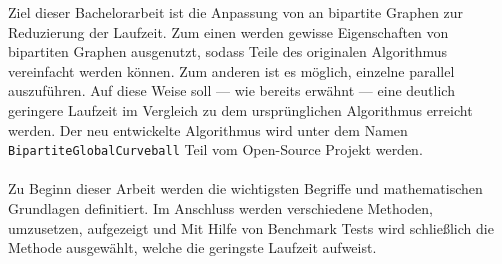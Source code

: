 Ziel dieser Bachelorarbeit ist die Anpassung von \gc{} an bipartite Graphen zur 
Reduzierung der Laufzeit. Zum einen werden gewisse 
Eigenschaften von bipartiten Graphen ausgenutzt, sodass Teile des originalen \gc{} Algorithmus
vereinfacht werden können. Zum anderen ist es möglich, einzelne  parallel auszuführen.
Auf diese Weise soll --- wie bereits erwähnt --- eine deutlich geringere Laufzeit im Vergleich zu dem ursprünglichen \gc{}
Algorithmus erreicht werden.
Der neu entwickelte Algorithmus wird unter dem Namen \texttt{BipartiteGlobalCurveball} 
Teil vom Open-Source Projekt \nk{} werden.
\\
\\
\newpage
Zu Beginn dieser Arbeit werden die wichtigsten Begriffe und mathematischen Grundlagen definitiert.
Im Anschluss werden verschiedene Methoden, \gc{} umzusetzen,  aufgezeigt und  
Mit Hilfe von Benchmark Tests wird schließlich die Methode ausgewählt, welche die geringste Laufzeit 
aufweist.
